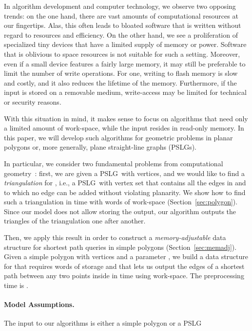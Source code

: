 \documentclass[11pt,a4paper]{article}
\newcommand{\pslg}{PSLG}
\begin{document}
In algorithm development and computer technology, we observe
two opposing trends: on the one hand, there are vast amounts
of computational resources at our fingertips.
Alas, this often leads to bloated software that is written without regard to
resources and efficiency.
On the other hand, we see a proliferation of specialized tiny  devices
that have a limited supply of memory
or power. Software that is oblivious to space
resources is not suitable for such a setting.
Moreover, even if a small device features a fairly large memory, it may still
be preferable to limit the number of write operations.
For one, writing to flash memory is
slow and costly, and it also reduces the lifetime of the memory.
Furthermore, if the input is stored on a removable medium, write-access
may be limited for technical or security reasons.

With this situation in mind, it makes sense to focus on
algorithms that need only a limited amount
of work-space, while the input resides in read-only memory.
In this paper, we will develop such algorithms for geometric
problems in planar polygons or, more generally, plane straight-line graphs
(PSLGs).

In particular, we consider two fundamental problems from computational
geometry~\cite{deBergChvKrOv08}:
first, we are given a \pslg\  with  vertices, and
we would like to find a \emph{triangulation} for , i.e., a
\pslg\ with vertex set  that contains all the edges in  and
to which no edge can be added without violating planarity.
We show how to find such a triangulation in  time
with  words of work-space (Section~\ref{sec:polygon}).
Since our model does not allow storing the output, our algorithm outputs
the triangles of the triangulation one after another.

Then,  we apply this result in order to construct
a \emph{memory-adjustable} data structure for shortest path queries
in simple polygons (Section~\ref{sec:memadj}).
Given a simple polygon  with  vertices and a parameter
, we  build a data structure for  that
requires  words of storage and that lets us output the
edges of a shortest path between any two points inside  in
 time using  work-space.
The preprocessing time is .

\paragraph{Model Assumptions.}\label{sec:def}

The input to our algorithms is either a simple polygon  or a \pslg\
\end{document}
